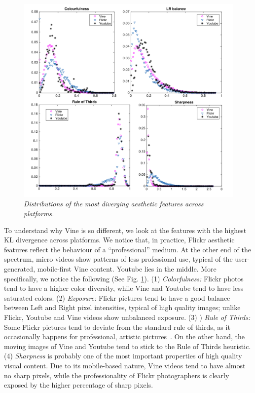 \begin{figure}[!htb]
\centering
\includegraphics[width=\columnwidth]{plots/comparison/aesthetics}
\caption{\textsl{ Distributions of the most diverging aesthetic features across platforms.}}
\label{fig:comparison_aesthetics}
\end{figure}


To understand why Vine is so different, we look at the features with the highest KL divergence across platforms. We notice that, in practice, Flickr aesthetic features reflect the behaviour of a ``professional'' medium. At the other end of the spectrum, micro videos show patterns of less professional use, typical  of the  user-generated, mobile-first Vine content. Youtube lies in the middle. More specifically, we notice the following (See Fig. \ref{fig:comparison_aesthetics}). (1) \emph{Colorfulness:}  Flickr photos tend to have a higher color diversity, while Vine and Youtube tend to have less saturated colors. (2) \emph{Exposure:}  Flickr pictures tend to have a good balance between Left and Right  pixel intensities, typical of high quality images; unlike Flickr, Youtube and Vine videos show unbalanced exposure. (3) ) \emph{Rule of Thirds:}  Some Flickr pictures tend to deviate from the standard rule of thirds, as it occasionally happens for professional, artistic pictures~\cite{freeman2007photographer}. On the other hand, the moving images of Vine and Youtube tend to stick to the Rule of Thirds heuristic. (4) \emph{Sharpness} is probably one of the most important properties of high quality visual content. Due to its mobile-based nature, Vine videos tend to have almost no sharp pixels, while the professionality of Flickr photographers is clearly exposed by the higher percentage of sharp pixels.

